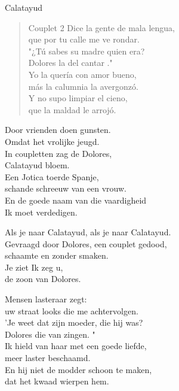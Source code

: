 \begin{song}{Calatayud}
\begin{verse}{Couplet 2}
Dice la gente de mala lengua,\\
que por tu calle me ve rondar.\hspace{1.5em}\\
"¿Tú sabes su madre quien era?\\
Dolores la del cantar ."\\
Yo la quería con amor bueno,\\
más la calumnia la avergonzó.\\
Y no supo\hspace{0.5em}\hspace{0.5em} limpiar el cieno,\\
que la maldad le arrojó.\\
\end{verse}
\end{song}

\clearpage
\begin{translation}
Door vrienden doen gunsten.\\
Omdat het vrolijke jeugd.\\
In coupletten zag de Dolores,\\
Calatayud bloem.\\
Een Jotica toerde Spanje,\\
schande schreeuw van een vrouw.\\
En de goede naam van die vaardigheid\\
Ik moet verdedigen.\vspace{\wlskip}

Als je naar Calatayud, als je naar Calatayud.\\
Gevraagd door Dolores, een couplet gedood,\\
schaamte en zonder smaken.\\
Je ziet Ik zeg u,\\
de zoon van Dolores.\vspace{\wlskip}

Mensen lasteraar zegt:\\
uw straat looks die me achtervolgen.\\
'Je weet dat zijn moeder, die hij was?\\
Dolores die van zingen. "\\
Ik hield van haar met een goede liefde,\\
meer laster beschaamd.\\
En hij niet de modder schoon te maken,\\
dat het kwaad wierpen hem.
\end{translation}
